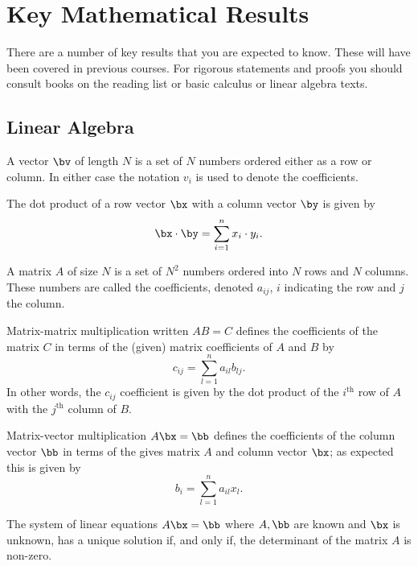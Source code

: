
\chapter{Key Mathematical Results}

There are a number of key results that you are expected to know. These
will have been covered in previous courses. For rigorous statements
and proofs you should consult books on the reading list or basic
calculus or linear algebra texts.

\section{Linear Algebra}

A vector $\bv$ of length $N$ is a set of $N$ numbers ordered either as
a row or column. In either case the notation $v_i$ is used to denote
the coefficients. 

The dot product of a row vector $\bx$ with a column vector $\by$ is
given by
%
\begin{equation}
  \label{eq:key_la1}
  \bx \cdot \by = \sum_{i=1}^n x_i \cdot y_i.
\end{equation}

A matrix $A$ of size $N$ is a set of $N^2$ numbers ordered into $N$
rows and $N$ columns. These numbers are called the coefficients,
denoted $a_{ij}$, $i$ indicating the row and $j$ the column.

Matrix-matrix multiplication written $A B = C$ defines the
coefficients of the matrix $C$ in terms of the (given) matrix
coefficients of $A$ and $B$ by
%
\begin{equation}
  \label{eq:key_la2}
  c_{ij} = \sum_{l = 1}^n a_{i l} b_{l j}.
\end{equation}
%
In other words, the $c_{ij}$ coefficient is given by the dot product
of the $i^{\text{th}}$ row of $A$ with the $j^{\text{th}}$ column of
$B$.

Matrix-vector multiplication $A \bx = \bb$ defines the coefficients of
the column vector $\bb$ in terms of the gives matrix $A$ and column
vector $\bx$; as expected this is given by
%
\begin{equation}
  \label{eq:key_la3}
  b_{i} = \sum_{l = 1}^n a_{i l} x_{l}.
\end{equation}

The system of linear equations $A \bx = \bb$ where $A, \bb$ are known
and $\bx$ is unknown, has a unique solution if, and only if, the
determinant of the matrix $A$ is non-zero.

